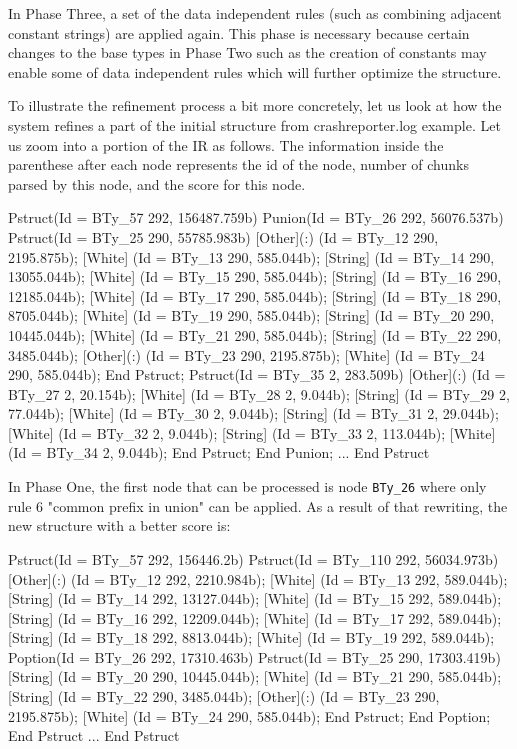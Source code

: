 In Phase Three, a set of the data independent rules
(such as combining adjacent constant strings) are applied again. 
This phase is necessary because certain changes
to the base types in Phase Two such as the creation of constants may 
enable some of data independent rules which will further optimize the structure. 

To illustrate the refinement process a bit more concretely, let us look at how
the system refines a part of the initial structure from crashreporter.log example.
Let us zoom into a portion of the IR as follows. The information inside the
parenthese after each node represents the id of the node, number of
chunks parsed by this node, and the score for this node.

\begin{code}
Pstruct(Id = BTy_57 292, 156487.759b)
  Punion(Id = BTy_26 292, 56076.537b)
    Pstruct(Id = BTy_25 290, 55785.983b)
      [Other](:) (Id = BTy_12 290, 2195.875b);
      [White] (Id = BTy_13 290, 585.044b);
      [String] (Id = BTy_14 290, 13055.044b);
      [White] (Id = BTy_15 290, 585.044b);
      [String] (Id = BTy_16 290, 12185.044b);
      [White] (Id = BTy_17 290, 585.044b);
      [String] (Id = BTy_18 290, 8705.044b);
      [White] (Id = BTy_19 290, 585.044b);
      [String] (Id = BTy_20 290, 10445.044b);
      [White] (Id = BTy_21 290, 585.044b);
      [String] (Id = BTy_22 290, 3485.044b);
      [Other](:) (Id = BTy_23 290, 2195.875b);
      [White] (Id = BTy_24 290, 585.044b);
    End Pstruct;
    Pstruct(Id = BTy_35 2, 283.509b)
    [Other](:) (Id = BTy_27 2, 20.154b);
      [White] (Id = BTy_28 2, 9.044b);
      [String] (Id = BTy_29 2, 77.044b);
      [White] (Id = BTy_30 2, 9.044b);
      [String] (Id = BTy_31 2, 29.044b);
      [White] (Id = BTy_32 2, 9.044b);
      [String] (Id = BTy_33 2, 113.044b);
      [White] (Id = BTy_34 2, 9.044b);
    End Pstruct;
  End Punion;
  ...
End Pstruct
\end{code}

In Phase One, the first node that can be processed is node {\tt BTy\_26}
where only rule 6 "common prefix in union" can be applied. As a result of that
rewriting, the new structure with a better score is:

\begin{code}
Pstruct(Id = BTy_57 292, 156446.2b)
  Pstruct(Id = BTy_110 292, 56034.973b)
    [Other](:) (Id = BTy_12 292, 2210.984b);
    [White] (Id = BTy_13 292, 589.044b);
    [String] (Id = BTy_14 292, 13127.044b);
    [White] (Id = BTy_15 292, 589.044b);
    [String] (Id = BTy_16 292, 12209.044b);
    [White] (Id = BTy_17 292, 589.044b);
    [String] (Id = BTy_18 292, 8813.044b);
    [White] (Id = BTy_19 292, 589.044b);
    Poption(Id = BTy_26 292, 17310.463b)
      Pstruct(Id = BTy_25 290, 17303.419b)
    	[String] (Id = BTy_20 290, 10445.044b);
    	[White] (Id = BTy_21 290, 585.044b);
    	[String] (Id = BTy_22 290, 3485.044b);
    	[Other](:) (Id = BTy_23 290, 2195.875b);
    	[White] (Id = BTy_24 290, 585.044b);
      End Pstruct;
    End Poption;
  End Pstruct
  ...
End Pstruct
\end{code}

